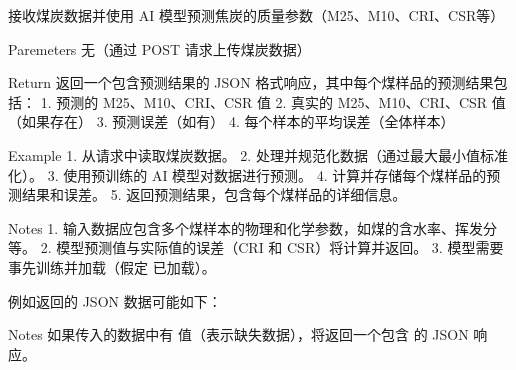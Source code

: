 \documentclass[a4paper,12pt,english]{sphinxmanual}
\begin{document}

\begin{fulllineitems}
\label{\detokenize{api/login:login.getCokeQualityfyeResultAI}}
\pysigstartsignatures
{}
\pysigstopsignatures
\sphinxAtStartPar
接收煤炭数据并使用 AI 模型预测焦炭的质量参数（M25、M10、CRI、CSR等）

\sphinxAtStartPar
Paremeters
无（通过 POST 请求上传煤炭数据）

\sphinxAtStartPar
Return
返回一个包含预测结果的 JSON 格式响应，其中每个煤样品的预测结果包括：
1. 预测的 M25、M10、CRI、CSR 值
2. 真实的 M25、M10、CRI、CSR 值（如果存在）
3. 预测误差（如有）
4. 每个样本的平均误差（全体样本）

\sphinxAtStartPar
Example
1. 从请求中读取煤炭数据。
2. 处理并规范化数据（通过最大最小值标准化）。
3. 使用预训练的 AI 模型对数据进行预测。
4. 计算并存储每个煤样品的预测结果和误差。
5. 返回预测结果，包含每个煤样品的详细信息。

\sphinxAtStartPar
Notes
1. 输入数据应包含多个煤样本的物理和化学参数，如煤的含水率、挥发分等。
2. 模型预测值与实际值的误差（CRI 和 CSR）将计算并返回。
3. 模型需要事先训练并加载（假定  已加载）。

\sphinxAtStartPar
例如返回的 JSON 数据可能如下：

\sphinxAtStartPar
Notes
如果传入的数据中有  值（表示缺失数据），将返回一个包含  的 JSON 响应。

\end{fulllineitems}

\end{document}
